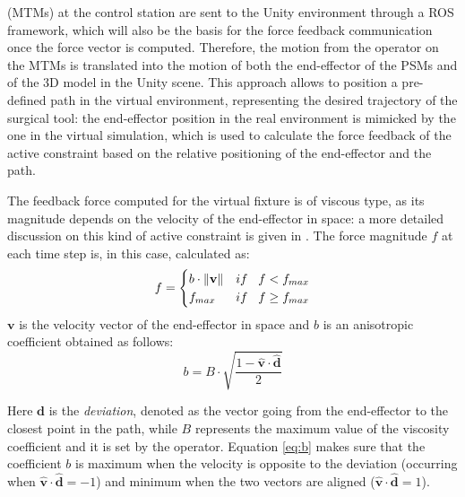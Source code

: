 \documentclass[conference]{IEEEtran}
\newcommand{\vers}[1]{\hat{\textbf{#1}}}
\newcommand{\vect}[1]{\textbf{#1}}
\newcommand{\norm}[1]{\left\lVert #1\right\rVert}
\begin{document}
(MTMs) at the control station are sent to the Unity environment
through a ROS framework, which will also be the basis for the force
feedback communication once the force vector is computed. Therefore,
the motion from the operator on the MTMs is translated into the motion
of both the end-effector of the PSMs and of the 3D model in the Unity
scene. This approach allows to position a pre-defined path in the
virtual environment, representing the desired trajectory of the
surgical tool: the end-effector position in the real environment is
mimicked by the one in the virtual simulation, which is used to
calculate the force feedback of the active constraint based on the
relative positioning of the end-effector and the path. 

The feedback force computed for the virtual fixture is of viscous
type, as its magnitude depends on the velocity of the end-effector in
space: a more detailed discussion on this kind of active constraint is
given in \cite{equations}. The force magnitude $f$ at each time step
is, in this case, calculated as:
\begin{equation}
    f = \begin{cases}
    b\cdot \norm{\vect{v}} & if \hspace{0.3cm}f<f_{max} \\
    f_{max} & if \hspace{0.3cm} f\geq f_{max}
    \end{cases}
    \label{eq:1}
\end{equation}
$\textbf{v}$ is the velocity vector of the end-effector in space and
$b$ is an anisotropic coefficient obtained as follows:
\begin{equation}
    b = B\cdot\sqrt{\frac{1-\vers{v}\cdot\vers{d}}{2}}
    \label{eq:b}
\end{equation}

Here $\textbf{d}$ is the \textit{deviation}, denoted as the vector
going from the end-effector to the closest point in the path, while
$B$ represents the maximum value of the viscosity coefficient and it
is set by the operator. Equation \ref{eq:b} makes sure that the
coefficient $b$ is maximum when the velocity is opposite to the
deviation (occurring when $\hat{\textbf{v}}\cdot\hat{\textbf{d}}=-1$)
and minimum when the two vectors are aligned
($\hat{\textbf{v}}\cdot\hat{\textbf{d}}=1$). 
\end{document}
